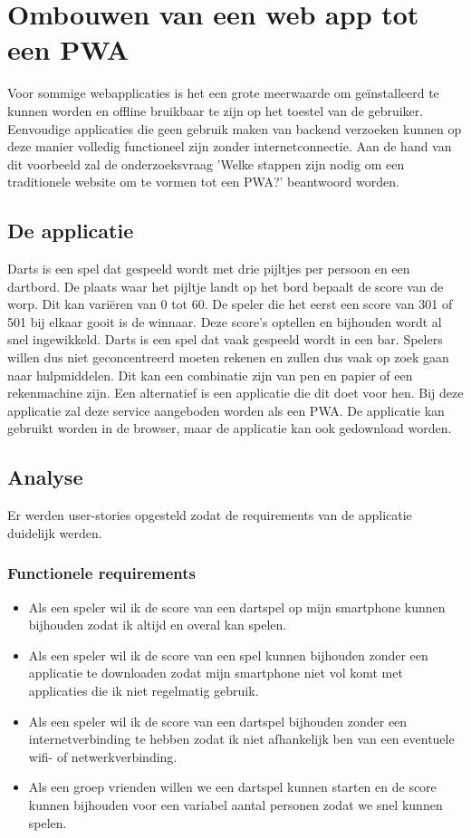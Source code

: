 \chapter{Ombouwen van een web app tot een PWA}
\label{ch:TransformerenNaarEenPWA}

Voor sommige webapplicaties is het een grote meerwaarde om geïnstalleerd te kunnen worden  en offline bruikbaar te zijn op het toestel van de gebruiker.\autocite{Mozilla2020c} Eenvoudige applicaties die geen gebruik maken van backend verzoeken kunnen op deze manier volledig functioneel zijn zonder internetconnectie. 
Aan de hand van dit voorbeeld zal de onderzoeksvraag 'Welke stappen zijn nodig om een traditionele website om te vormen tot een PWA?' beantwoord worden.

\section{De applicatie}

	Darts is een spel dat gespeeld wordt met drie pijltjes per persoon en een dartbord. De plaats waar het pijltje landt op het bord bepaalt de score van de worp. Dit kan variëren van 0 tot 60. De speler die het eerst een score van 301 of  501 bij elkaar gooit is de winnaar. Deze score’s optellen en bijhouden wordt al snel ingewikkeld. Darts is een spel dat vaak gespeeld wordt in een bar. Spelers willen dus niet geconcentreerd moeten rekenen en zullen dus vaak op zoek gaan naar hulpmiddelen. Dit kan een combinatie zijn van pen en papier of een rekenmachine zijn. Een alternatief is een applicatie die dit doet voor hen. Bij deze applicatie zal deze service aangeboden worden als een PWA. De applicatie kan gebruikt worden in de browser, maar de applicatie kan ook gedownload worden.

\section{Analyse}

	Er werden user-stories opgesteld zodat de requirements van de applicatie duidelijk werden.  
	
	\subsection{Functionele requirements}
		\begin{itemize}
			 \item 	Als een speler wil ik de score van een dartspel op mijn smartphone kunnen bijhouden zodat ik altijd en overal kan spelen.
			 \item 	Als een speler wil ik de score van een spel kunnen bijhouden zonder een applicatie te downloaden zodat mijn smartphone niet vol komt met applicaties die ik niet regelmatig gebruik.
			 \item 	Als een speler wil ik de score van een dartspel bijhouden zonder een internetverbinding te hebben zodat ik niet afhankelijk ben van een eventuele wifi-  of netwerkverbinding.
			 \item 	Als een groep vrienden willen we een dartspel kunnen starten en de score kunnen bijhouden voor een variabel aantal personen zodat we snel kunnen spelen.
		\end{itemize}	
	
